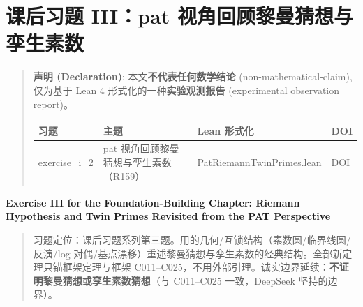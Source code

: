 \documentclass[
]{article}
\author{}
\date{}
\newcounter{none} %
\begin{document}
\section{课后习题 III：pat
视角回顾黎曼猜想与孪生素数}\label{ux7b51ux57faux7bc7ux8bfeux540eux4e60ux9898-iiipat-ux89c6ux89d2ux56deux987eux9eceux66fcux731cux60f3ux4e0eux5b6aux751fux7d20ux6570}

\begin{quote}
\textbf{声明 (Declaration)}: 本文\textbf{不代表任何数学结论}
(non-mathematical-claim), 仅为基于 Lean 4
形式化的一种\textbf{实验观测报告} (experimental observation report)。

{\def\LTcaptype{none} %
\begin{longtable}[]{@{}
 >{\raggedright\arraybackslash}p{}
 >{\raggedright\arraybackslash}p{}
 >{\raggedright\arraybackslash}p{}
 >{\raggedright\arraybackslash}p{}@{}}
\toprule\noalign{}
\begin{minipage}[b]{\linewidth}\raggedright
习题
\end{minipage} & \begin{minipage}[b]{\linewidth}\raggedright
主题
\end{minipage} & \begin{minipage}[b]{\linewidth}\raggedright
Lean 形式化
\end{minipage} & \begin{minipage}[b]{\linewidth}\raggedright
DOI
\end{minipage} \\
\midrule\noalign{}
\endhead
\bottomrule\noalign{}
\endlastfoot
exercise\_i\_2 & pat 视角回顾黎曼猜想与孪生素数（R159） &
PatRiemannTwinPrimes.lean & DOI \\
\end{longtable}
}
\end{quote}

\textbf{Exercise III for the Foundation-Building Chapter: Riemann
Hypothesis and Twin Primes Revisited from the PAT Perspective}

\begin{quote}
习题定位：课后习题系列第三题。用的几何/互锁结构（素数圆/临界线圆/反演/log
对偶/基点漂移）重述黎曼猜想与孪生素数的经典结构。全部新定理只锚框架定理与框架
C011--C025，不用外部引理。诚实边界延续：\textbf{不证明黎曼猜想或孪生素数猜想}（与
C011--C025 一致，DeepSeek 坚持的边界）。
\end{quote}
\end{document}
